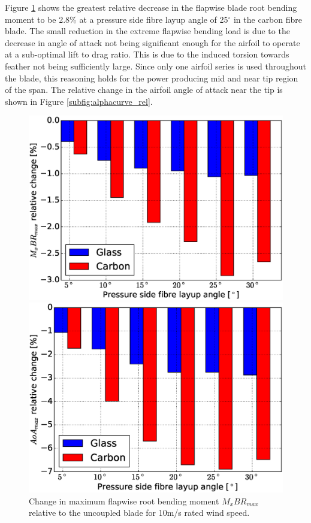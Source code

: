 \documentclass[a4paper]{jpconf}
\begin{document}
Figure \ref{subfig:mx_rel} shows the greatest relative decrease in the flapwise blade root bending moment to be 2.8\% at a pressure side fibre layup angle of 25$^\circ$ in the carbon fibre blade. The small reduction in the extreme flapwise bending load is due to the decrease in angle of attack not being significant enough for the airfoil to operate at a sub-optimal lift to drag ratio. This is due to the induced torsion towards feather not being sufficiently large. Since only one airfoil series is used throughout the blade, this reasoning holds for the power producing mid and near tip region of the span. The relative change in the airfoil angle of attack near the tip is shown in Figure \ref{subfig:alphacurve_rel}.


\begin{figure}[pth]
\centering
\begin{minipage}{0.45\textwidth}
\includegraphics[width=\linewidth]{Figures/Chapter4/Load/steady_relmxbr.eps}
\caption{\label{subfig:mx_rel}Change in maximum flapwise root bending moment $M_xBR_{max}$ relative to the uncoupled blade for 10m/s rated wind speed.}
\end{minipage}\hspace{0.10\textwidth}%
\begin{minipage}{0.45\textwidth}
\includegraphics[width=\linewidth]{Figures/Chapter4/Load/steady_relalpha.eps}

\end{minipage}
\end{figure}
\end{document}
